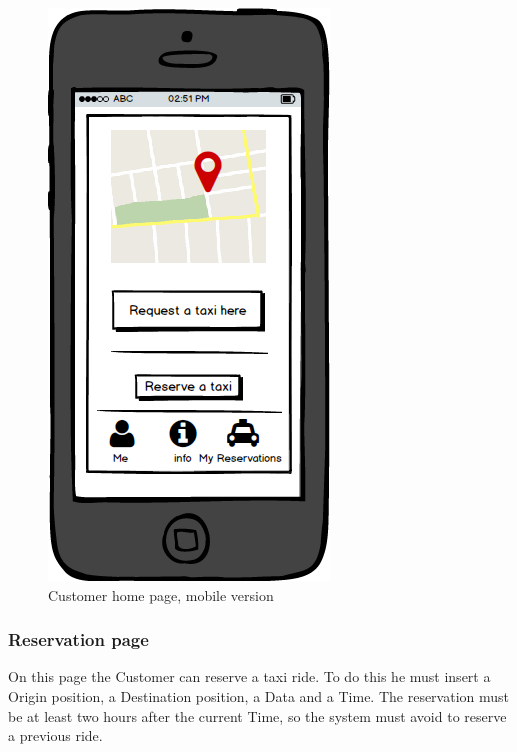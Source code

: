 				\begin{figure}[H]
					\centering
					\includegraphics[scale=0.4]{IMG/UserInterfaces/mainCustomer_m.png}
					\caption{Customer home page, mobile version}\label{chome_m}
				\end{figure}
			
			\subsubsection{Reservation page}
			On this page the Customer can reserve a taxi ride. To do this he must insert a Origin position, a Destination position, a Data and a Time. The reservation must be at least two hours after the current Time, so the system must avoid to reserve a previous ride.
			
